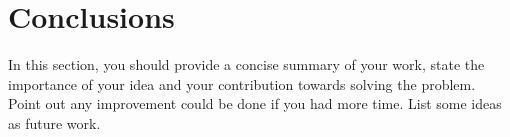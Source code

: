 \section{Conclusions}
In this section, you should provide a concise summary of your work, state the importance of your idea and your contribution towards solving the problem. Point out any improvement could be done  if you had more time. List some ideas as future work. 
